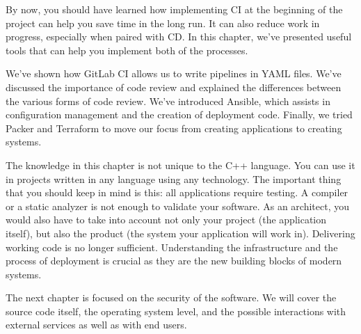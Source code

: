 By now, you should have learned how implementing CI at the beginning of the project can help you save time in the long run. It can also reduce work in progress, especially when paired with CD. In this chapter, we've presented useful tools that can help you implement both of the processes.

We've shown how GitLab CI allows us to write pipelines in YAML files. We've discussed the importance of code review and explained the differences between the various forms of code review. We've introduced Ansible, which assists in configuration management and the creation of deployment code. Finally, we tried Packer and Terraform to move our focus from creating applications to creating systems.

The knowledge in this chapter is not unique to the C++ language. You can use it in projects written in any language using any technology. The important thing that you should keep in mind is this: all applications require testing. A compiler or a static analyzer is not enough to validate your software. As an architect, you would also have to take into account not only your project (the application itself), but also the product (the system your application will work in). Delivering working code is no longer sufficient. Understanding the infrastructure and the process of deployment is crucial as they are the new building blocks of modern systems.

The next chapter is focused on the security of the software. We will cover the source code itself, the operating system level, and the possible interactions with external services as well as with end users.